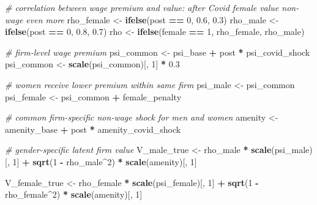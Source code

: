 \documentclass[
]{article}
\newenvironment{Shaded}{\begin{snugshade}}{\end{snugshade}}
\newcommand{\CommentTok}[1]{\textcolor[rgb]{0.56,0.35,0.01}{\textit{#1}}}
\newcommand{\DecValTok}[1]{\textcolor[rgb]{0.00,0.00,0.81}{#1}}
\newcommand{\FloatTok}[1]{\textcolor[rgb]{0.00,0.00,0.81}{#1}}
\newcommand{\FunctionTok}[1]{\textcolor[rgb]{0.13,0.29,0.53}{\textbf{#1}}}
\newcommand{\NormalTok}[1]{#1}
\newcommand{\OtherTok}[1]{\textcolor[rgb]{0.56,0.35,0.01}{#1}}
\newcommand{\SpecialCharTok}[1]{\textcolor[rgb]{0.81,0.36,0.00}{\textbf{#1}}}
\begin{document}
\begin{Shaded}
\begin{Highlighting}[]
        \CommentTok{\# correlation between wage premium and value: after Covid female value non{-}wage even more}
\NormalTok{        rho\_female }\OtherTok{\textless{}{-}} \FunctionTok{ifelse}\NormalTok{(post }\SpecialCharTok{==} \DecValTok{0}\NormalTok{, }\FloatTok{0.6}\NormalTok{, }\FloatTok{0.3}\NormalTok{)}
\NormalTok{        rho\_male }\OtherTok{\textless{}{-}} \FunctionTok{ifelse}\NormalTok{(post }\SpecialCharTok{==} \DecValTok{0}\NormalTok{, }\FloatTok{0.8}\NormalTok{, }\FloatTok{0.7}\NormalTok{)}
\NormalTok{        rho }\OtherTok{\textless{}{-}} \FunctionTok{ifelse}\NormalTok{(female }\SpecialCharTok{==} \DecValTok{1}\NormalTok{, rho\_female, rho\_male)}

        \CommentTok{\# firm{-}level wage premium}
\NormalTok{        psi\_common }\OtherTok{\textless{}{-}}\NormalTok{ psi\_base }\SpecialCharTok{+}\NormalTok{ post }\SpecialCharTok{*}\NormalTok{ psi\_covid\_shock}
\NormalTok{        psi\_common }\OtherTok{\textless{}{-}} \FunctionTok{scale}\NormalTok{(psi\_common)[, }\DecValTok{1}\NormalTok{] }\SpecialCharTok{*} \FloatTok{0.3}

        \CommentTok{\# women receive lower premium within same firm}
\NormalTok{        psi\_male }\OtherTok{\textless{}{-}}\NormalTok{ psi\_common}
\NormalTok{        psi\_female }\OtherTok{\textless{}{-}}\NormalTok{ psi\_common }\SpecialCharTok{+}\NormalTok{ female\_penalty}

        \CommentTok{\# common firm{-}specific non{-}wage shock for men and women}
\NormalTok{        amenity }\OtherTok{\textless{}{-}}\NormalTok{ amenity\_base }\SpecialCharTok{+}\NormalTok{ post }\SpecialCharTok{*}\NormalTok{ amenity\_covid\_shock}

        \CommentTok{\# gender{-}specific latent firm value}
\NormalTok{        V\_male\_true }\OtherTok{\textless{}{-}}\NormalTok{ rho\_male }\SpecialCharTok{*} \FunctionTok{scale}\NormalTok{(psi\_male)[, }\DecValTok{1}\NormalTok{] }\SpecialCharTok{+}
            \FunctionTok{sqrt}\NormalTok{(}\DecValTok{1} \SpecialCharTok{{-}}\NormalTok{ rho\_male}\SpecialCharTok{\^{}}\DecValTok{2}\NormalTok{) }\SpecialCharTok{*} \FunctionTok{scale}\NormalTok{(amenity)[, }\DecValTok{1}\NormalTok{]}

\NormalTok{        V\_female\_true }\OtherTok{\textless{}{-}}\NormalTok{ rho\_female }\SpecialCharTok{*} \FunctionTok{scale}\NormalTok{(psi\_female)[, }\DecValTok{1}\NormalTok{] }\SpecialCharTok{+}
            \FunctionTok{sqrt}\NormalTok{(}\DecValTok{1} \SpecialCharTok{{-}}\NormalTok{ rho\_female}\SpecialCharTok{\^{}}\DecValTok{2}\NormalTok{) }\SpecialCharTok{*} \FunctionTok{scale}\NormalTok{(amenity)[, }\DecValTok{1}\NormalTok{]}


\end{Highlighting}
\end{Shaded}
\end{document}
